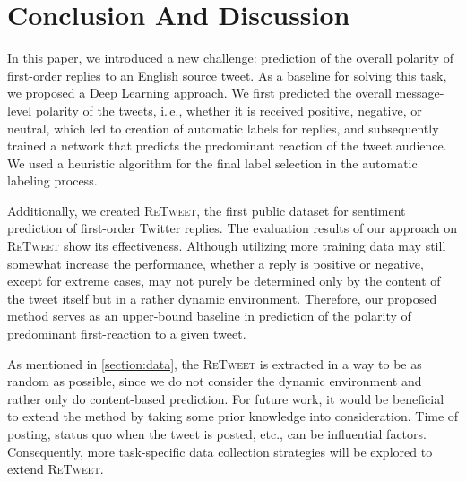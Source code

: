 \documentclass[conference]{IEEEtran}
\newcommand{\ie}{i.\,e.,\xspace}
\newcommand{\retweet}{\textsc{ReTweet}\xspace}
\begin{document}
\section{Conclusion And Discussion}
\label{section:Discussion}
In this paper, we introduced a new challenge: prediction of the overall polarity of first-order replies to an English source tweet. As a baseline for solving this task, we proposed a Deep Learning approach. 
We first predicted the overall message-level polarity of the tweets, \ie whether it is received positive, negative, or neutral, which led to creation of automatic labels for replies, and subsequently trained a network that predicts the predominant reaction of the tweet audience. 
We used a heuristic algorithm for the final label selection in the automatic labeling process.

Additionally, we created \retweet, the first public dataset for sentiment prediction of first-order Twitter replies. 
The evaluation results of our approach on \retweet show its effectiveness.
Although utilizing more training data may still somewhat increase the performance, whether a reply is positive or negative, except for extreme cases, may not purely be determined only by the content of the tweet itself but in a rather dynamic environment. Therefore, our proposed method serves as an upper-bound baseline in prediction of the polarity of predominant first-reaction to a given tweet.

As mentioned in \cref{section:data}, the \retweet is extracted in a way to be as random as possible, since we do not consider the dynamic environment and rather only do content-based prediction.
For future work, it would be beneficial to extend the method by taking some prior knowledge into consideration. Time of posting, status quo when the tweet is posted, etc., can be influential factors.
Consequently, more task-specific data collection strategies will be explored to extend  \retweet.





\end{document}
